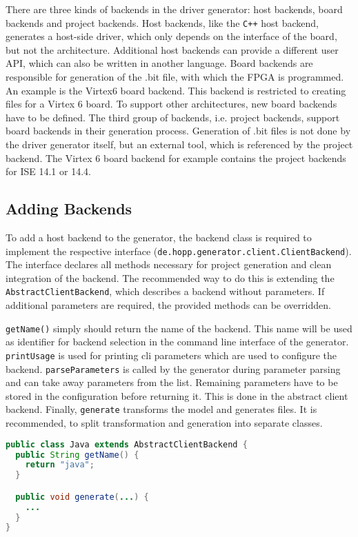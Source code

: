 \documentclass{report}
\begin{document}
There are three kinds of backends in the driver generator: host backends, board backends and project backends.
Host backends, like the \texttt{C++} host backend, generates a host-side driver, which only depends on the interface of the board, but not the architecture. Additional host backends can provide a different user API, which can also be written in another language.
Board backends are responsible for generation of the .bit file, with which the FPGA is programmed. An example is the Virtex6 board backend. This backend is restricted to creating files for a Virtex 6 board. To support other architectures, new board backends have to be defined.
The third group of backends, i.e. project backends, support board backends in their generation process. Generation of .bit files is not done by the driver generator itself, but an external tool, which is referenced by the project backend. The Virtex 6 board backend for example contains the project backends for ISE 14.1 or 14.4.


\subsection{Adding Backends}
To add a host backend to the generator, the backend class is required to implement the respective interface (\texttt{de.hopp.generator.client.ClientBackend}). The interface declares all methods necessary for project generation and clean integration of the backend. The recommended way to do this is extending the \texttt{AbstractClientBackend}, which describes a backend without parameters. If additional parameters are required, the provided methods can be overridden.

\texttt{getName()} simply should return the name of the backend. This name will be used as identifier for backend selection in the command line interface of the generator. \texttt{printUsage} is used for printing cli parameters which are used to configure the backend. \texttt{parseParameters} is called by the generator during parameter parsing and can take away parameters from the list. Remaining parameters have to be stored in the configuration before returning it. This is done in the abstract client backend. Finally, \texttt{generate} transforms the model and generates files. It is recommended, to split transformation and generation into separate classes.

\begin{lstlisting}[language=java]
public class Java extends AbstractClientBackend {
  public String getName() {
    return "java";
  }

  public void generate(...) {
    ...
  }
}
\end{lstlisting}
\end{document}
